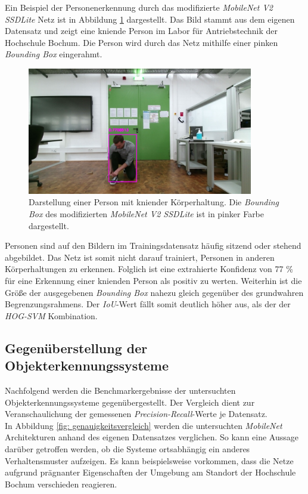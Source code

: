 Ein Beispiel der Personenerkennung durch das modifizierte \textit{MobileNet V2 SSDLite} Netz ist in Abbildung \ref{fig: ownnetiou} dargestellt. Das Bild stammt aus dem eigenen Datensatz und zeigt eine kniende Person im Labor für Antriebstechnik der Hochschule Bochum. Die Person wird durch das Netz mithilfe einer pinken \textit{Bounding Box} eingerahmt.\\
	\begin{figure}[H]
	\centering
	\includegraphics[width=0.88\textwidth]{Bilder/12.jpg}
	\caption{Darstellung einer Person mit kniender Körperhaltung. Die \textit{Bounding Box} des modifizierten \textit{MobileNet V2 SSDLite} ist in pinker Farbe dargestellt.}
	\label{fig: ownnetiou}
\end{figure}
Personen sind auf den Bildern im Trainingsdatensatz häufig sitzend oder stehend abgebildet. Das Netz ist somit nicht darauf trainiert, Personen in anderen Körperhaltungen zu erkennen. Folglich ist eine extrahierte Konfidenz von 77 \% für eine Erkennung einer knienden Person als positiv zu werten. Weiterhin ist die Größe der ausgegebenen \textit{Bounding Box} nahezu gleich gegenüber des grundwahren Begrenzungsrahmens. Der \textit{IoU}-Wert fällt somit deutlich höher aus, als der der \textit{HOG-SVM} Kombination.



\subsection{Gegenüberstellung der Objekterkennungssysteme}

Nachfolgend werden die Benchmarkergebnisse der untersuchten Objekterkennungssysteme gegenübergestellt. Der Vergleich dient zur Veranschaulichung der gemessenen \textit{Precision-Recall}-Werte je Datensatz.\\

In Abbildung \ref{fig: genauigkeitsvergleich} werden die untersuchten \textit{MobileNet} Architekturen anhand des eigenen Datensatzes verglichen. So kann eine Aussage darüber getroffen werden, ob die Systeme ortsabhängig ein anderes Verhaltensmuster aufzeigen. Es kann beispielsweise vorkommen, dass die Netze aufgrund prägnanter Eigenschaften der Umgebung am Standort der Hochschule Bochum verschieden reagieren.\\

